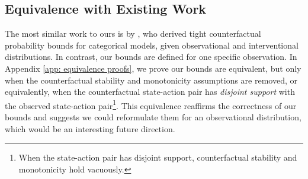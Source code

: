 \subsection{Equivalence with Existing Work}
\label{sec: equivalence with Li}
The most similar work to ours is by \citet{li2024probabilities}, who derived tight counterfactual probability bounds for categorical models, given observational and interventional distributions. In contrast, our bounds are defined for one specific observation. In Appendix \ref{app: equivalence proofs}, we prove our bounds are equivalent, but only when the counterfactual stability and monotonicity assumptions are removed, or equivalently, when the counterfactual state-action pair has \textit{disjoint support} with the observed state-action pair\footnote{When the state-action pair has disjoint support, counterfactual stability and monotonicity hold vacuously.}. This equivalence reaffirms the correctness of our bounds and suggests we could reformulate them for an observational distribution, which would be an interesting future direction.